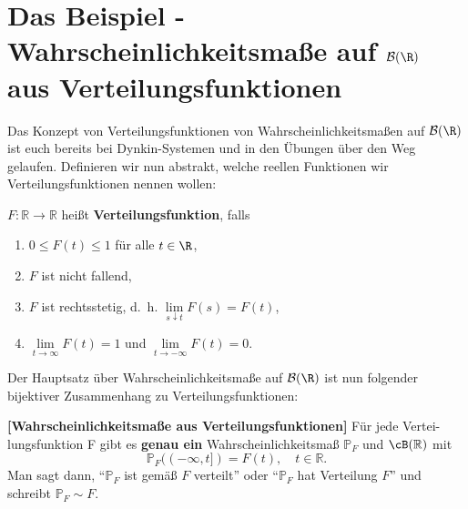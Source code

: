 \section[Das Beispiel f\"ur Wahrscheinlichkeitsma\ss e]{Das Beispiel - Wahrscheinlichkeitsmaße auf $\mathcal B(\R)$ aus Verteilungsfunktionen}
Das Konzept von Verteilungsfunktionen von Wahrscheinlichkeitsma\ss en auf $\mathcal B(\R)$ ist euch bereits bei Dynkin-Systemen und in den \"Ubungen \"uber den Weg gelaufen. Definieren wir nun abstrakt, welche reellen Funktionen wir Verteilungsfunktionen nennen wollen:
\begin{deff}
	$F \! : \mathbb{R} \rightarrow \mathbb{R}$ heißt \textbf{Verteilungsfunktion}, falls 
	\begin{enumerate}[label=(\roman*)]
		\item $0 \leq F(t) \leq 1$ f\"ur alle $t\in\R$,
		\item $F$ ist nicht fallend,
		\item $F$ ist rechtsstetig, \mbox{d. h.} $\lim\limits_{s \downarrow t} F(s) = F(t)$,
		\item $\lim\limits_{t \to \infty} F(t) = 1$ und $\lim\limits_{t \to - \infty} F(t) = 0$.
	\end{enumerate}
\end{deff}
Der Hauptsatz \"uber Wahrscheinlichkeitsma\ss e auf $\mathcal B(\R)$ ist nun folgender bijektiver Zusammenhang zu Verteilungsfunktionen:
\begin{satz}\label{EindVert}
 \textbf{[Wahrscheinlichkeitsma\ss e aus Verteilungsfunktionen]}
	Für jede Vertei-lungsfunktion F gibt es \textbf{genau ein} Wahrscheinlichkeitsmaß $\mathbb{P}_F$ und $\cB(\mathbb{R})$ mit $$\mathbb{P}_F((-\infty,t]) = F(t), \quad t \in \mathbb R.$$ Man sagt dann, \enquote{$\mathbb{P}_F$ ist gemäß $F$ verteilt} oder \enquote{$\mathbb{P}_F$ hat Verteilung $F$} und schreibt $\mathbb{P}_F\sim F$.
\end{satz}

